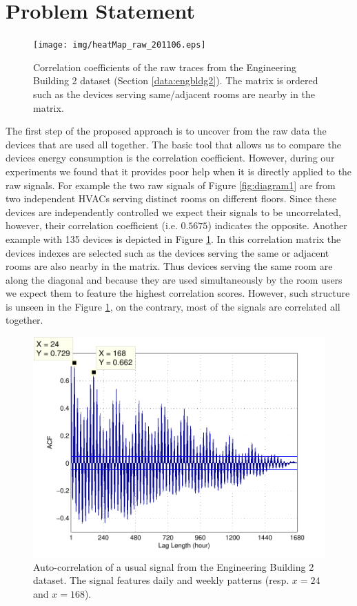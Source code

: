 \section{Problem Statement}
\begin{figure}
\begin{center}
\texttt{[image: img/heatMap\_raw\_201106.eps]}
\caption{Correlation coefficients of the raw traces from the Engineering Building 2 dataset (Section \ref{data:engbldg2}).
The matrix is ordered such as the devices serving same/adjacent rooms are nearby in the matrix.}
\label{fig:heatmap:raw}
\end{center}
\end{figure}

The first step of the proposed approach is to uncover from the raw data the devices that are used all together.
The basic tool that allows us to compare the devices energy consumption is the correlation coefficient.
However, during our experiments we found that it provides poor help when it is directly applied to the raw signals.
For example the two raw signals of Figure \ref{fig:diagram1} are from two independent HVACs serving distinct rooms on different floors.
Since these devices are independently controlled we expect their signals to be uncorrelated, however, their correlation coefficient (i.e. $0.5675$) indicates the opposite.
Another example with 135 devices is depicted in Figure \ref{fig:heatmap:raw}.
In this correlation matrix the devices indexes are selected such as the devices serving the same or adjacent rooms are also nearby in the matrix.
Thus devices serving the same room are along the diagonal and because they are used simultaneously by the room users we expect them to feature the highest correlation scores.
However, such structure is unseen in the Figure \ref{fig:heatmap:raw}, on the contrary, most of the signals are correlated all together.

\begin{figure}[t!]
\begin{center}
\includegraphics[width=.45\textwidth]{img/acf_101A1_GHP-eps-converted-to.pdf}
\caption{Auto-correlation of a usual signal from the Engineering Building 2 dataset.
The signal features daily and weekly patterns (resp. $x=24$ and $x=168$).}
\label{fig:autocorr}
\end{center}
\end{figure}

